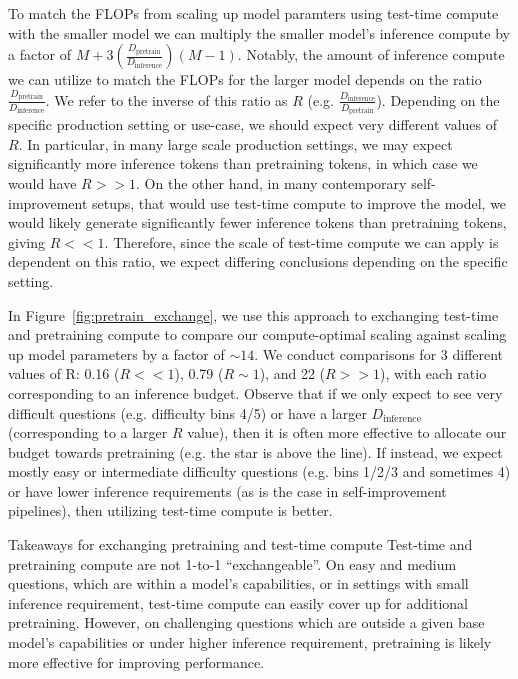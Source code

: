 To match the FLOPs from scaling up model paramters using test-time compute with the smaller model we can multiply the smaller model's inference compute by a factor of $M + 3 \left(\frac{D_{\text{pretrain}}}{D_{\text{inference}}}\right)(M-1)$. Notably, the amount of inference compute we can utilize to match the FLOPs for the larger model depends on the ratio $\frac{D_{\text{pretrain}}}{D_{\text{inference}}}$. We refer to the inverse of this ratio as $R$ (e.g. $\frac{D_{\text{inference}}}{D_{\text{pretrain}}}$). Depending on the specific production setting or use-case, we should expect very different values of $R$. In particular, in many large scale production settings, we may expect significantly more inference tokens than pretraining tokens, in which case we would have $R >> 1$. On the other hand, in many contemporary self-improvement setups, that would use test-time compute to improve the model, we would likely generate significantly fewer inference tokens than pretraining tokens, giving $R << 1$. Therefore, since the scale of test-time compute we can apply is dependent on this ratio, we expect differing conclusions depending on the specific setting.

In Figure~\ref{fig:pretrain_exchange}, we use this approach to exchanging test-time and pretraining compute to compare our compute-optimal scaling against scaling up model parameters by a factor of $\sim14$. We conduct comparisons for 3 different values of R: 0.16 ($R << 1$), 0.79 ($R \sim 1$), and 22 ($R >> 1$), with each ratio corresponding to an inference budget. Observe that if we only expect to see very difficult questions (e.g. difficulty bins 4/5) or have a larger $D_{\text{inference}}$ (corresponding to a larger $R$ value), then it is often more effective to allocate our budget towards pretraining (e.g. the star is above the line). If instead, we expect mostly easy or intermediate difficulty questions (e.g. bins 1/2/3 and sometimes 4) or have lower inference requirements (as is the case in self-improvement pipelines), then utilizing test-time compute  is better.

\begin{AIbox}{Takeaways for exchanging pretraining and test-time compute}
Test-time and pretraining compute are not 1-to-1 ``exchangeable''. On easy and medium questions, which are within a model's capabilities, or in settings with small inference requirement, test-time compute can easily cover up for additional pretraining. However, on challenging questions which are outside a given base model's capabilities or under higher inference requirement, pretraining is  likely more effective for improving performance.
\end{AIbox}

